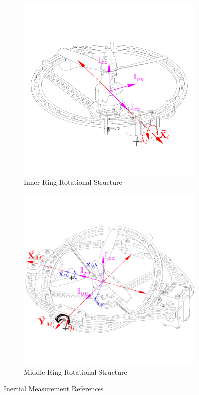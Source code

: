 \begin{figure}[htbp]
\centering
\begin{subfigure}{0.49\textwidth}
\includegraphics[width=\textwidth]{figs/inertia-inner}
\caption{Inner Ring Rotational Structure}
\label{fig:inertia-inner}
\end{subfigure}
\begin{subfigure}{0.49\textwidth}
\includegraphics[width=\textwidth]{figs/inertia-middle}
\caption{Middle Ring Rotational Structure}
\label{fig:inertia-middle}
\end{subfigure}
\caption{Inertial Measurement References}
\end{figure}
